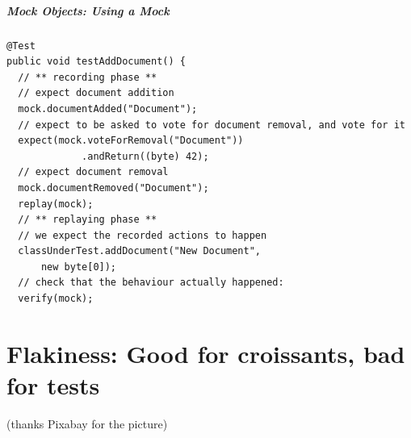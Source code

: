 \documentclass{beamer}
\newenvironment{changemargin}[1]{%
  \begin{list}{}{%
    \setlength{\topsep}{0pt}%
    \setlength{\leftmargin}{#1}%
    \setlength{\rightmargin}{1em}
    \setlength{\listparindent}{\parindent}%
    \setlength{\itemindent}{\parindent}%
    \setlength{\parsep}{\parskip}%
  }%
  \item[]}{\end{list}}
\begin{document}
\begin{frame}[fragile]
  \frametitle{Mock Objects: Using a Mock}
  \begin{changemargin}{1cm}
{\small
  \begin{lstlisting}
@Test
public void testAddDocument() {
  // ** recording phase **
  // expect document addition
  mock.documentAdded("Document");
  // expect to be asked to vote for document removal, and vote for it
  expect(mock.voteForRemoval("Document"))
             .andReturn((byte) 42);
  // expect document removal
  mock.documentRemoved("Document");
  replay(mock);
  // ** replaying phase **
  // we expect the recorded actions to happen
  classUnderTest.addDocument("New Document",
      new byte[0]);
  // check that the behaviour actually happened:
  verify(mock);
  \end{lstlisting}
}
  \end{changemargin}
\end{frame}

\part{Flakiness: Good for croissants, bad for tests}
\begin{frame}
  \partpage
  \begin{center}
    (thanks Pixabay for the picture)
  \end{center}
\end{frame}
\end{document}
